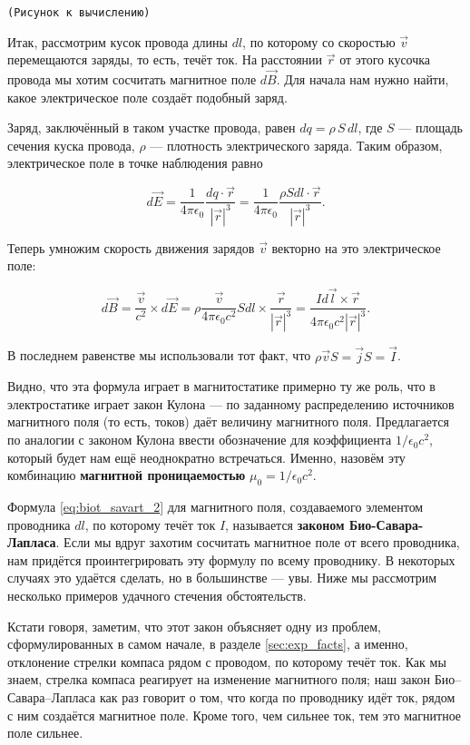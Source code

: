 \documentclass[a4paper,12pt]{article}
\newcommand{\eps}{\epsilon}
\newcommand{\com}[1]{{\Large{\texttt{{\color{red}(#1)}}}}}
\begin{document}
\com{Рисунок к вычислению}

Итак, рассмотрим кусок провода длины $dl$, по которому со скоростью
$\vec{v}$ перемещаются заряды, то есть, течёт ток. На расстоянии
$\vec{r}$ от этого кусочка провода мы хотим сосчитать магнитное поле
$d\vec{B}$. Для начала нам нужно найти, какое электрическое поле
создаёт подобный заряд.

Заряд, заключённый в таком участке провода, равен $dq = \rho\, S\,
dl$, где $S$ — площадь сечения куска провода, $\rho$ — плотность
электрического заряда. Таким образом, электрическое поле в точке
наблюдения равно 

\begin{equation}
  \label{eq:biot_savart_1}
  d\vec{E} = \frac{1}{4\pi\eps_0} \frac{dq \cdot \vec{r}}{|\vec{r}|^3}
  = \frac{1}{4\pi\eps_0} \frac{\rho S dl
    \cdot \vec{r}}{|\vec{r}|^3}.
\end{equation}

Теперь умножим скорость движения зарядов $\vec{v}$ векторно на это
электрическое поле: 

\begin{equation}
  \label{eq:biot_savart_2}
  d\vec{B} = \frac{\vec{v}}{c^2}  \times d\vec{E} = \rho \frac{\vec{v}}{4\pi\eps_0c^2} S dl \times
  \frac{\vec{r}}{|\vec{r}|^3} = \frac{I d\vec{l} \times \vec{r}}{4\pi\eps_0c^2|\vec{r}|^3}.
\end{equation}

В последнем равенстве мы использовали тот факт, что $\rho \vec{v} S =
\vec{j} S = \vec{I}$. 

Видно, что эта формула играет в магнитостатике примерно ту же роль,
что в электростатике играет закон Кулона --- по заданному
распределению источников магнитного поля (то есть, токов) даёт
величину магнитного поля. Предлагается по аналогии с законом Кулона
ввести обозначение для коэффициента $1/\eps_0c^2$, который будет нам
ещё неоднократно встречаться. Именно, назовём эту комбинацию
\textbf{магнитной проницаемостью} $\mu_0 = 1/\eps_0c^2$. 


Формула \eqref{eq:biot_savart_2} для магнитного поля, создаваемого
элементом проводника $dl$, по которому течёт ток $I$, называется
\textbf{законом Био-Савара-Лапласа}. Если мы вдруг захотим сосчитать
магнитное поле от всего проводника, нам придётся проинтегрировать эту
формулу по всему проводнику. В некоторых случаях это удаётся сделать,
но в большинстве — увы. Ниже мы рассмотрим несколько примеров удачного
стечения обстоятельств. 

Кстати говоря, заметим, что этот закон объясняет одну из проблем,
сформулированных в самом начале, в разделе \ref{sec:exp_facts}, а
именно, отклонение стрелки компаса рядом с проводом, по которому течёт
ток. Как мы знаем, стрелка компаса реагирует на изменение магнитного
поля; наш закон Био--Савара--Лапласа как раз говорит о том, что когда
по проводнику идёт ток, рядом с ним создаётся магнитное поле. Кроме
того, чем сильнее ток, тем это магнитное поле сильнее. 
\end{document}

